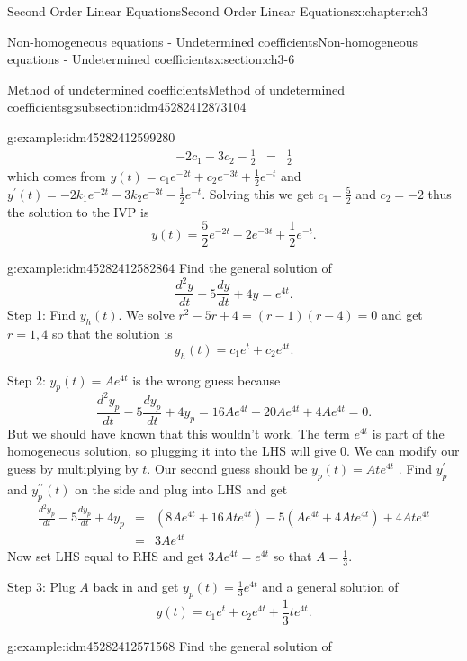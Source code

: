 \documentclass[oneside,10pt,]{book}
\numberwithin{equation}{section}
\numberwithin{equation}{section}
\newcommand{\amp}{&}
\begin{document}
\begin{chapterptx}{Second Order Linear Equations}{}{Second Order Linear Equations}{}{}{x:chapter:ch3}
\begin{sectionptx}{Non-homogeneous equations - Undetermined coefficients}{}{Non-homogeneous equations - Undetermined coefficients}{}{}{x:section:ch3-6}
\begin{subsectionptx}{Method of undetermined coefficients}{}{Method of undetermined coefficients}{}{}{g:subsection:idm45282412873104}
\begin{example}{}{g:example:idm45282412599280}
\begin{align*}
-2c_{1}-3c_{2}-\frac{1}{2} \amp = \amp \frac{1}{2}
\end{align*}
which comes from \(y(t)=c_{1}e^{-2t}+c_{2}e^{-3t}+\frac{1}{2}e^{-t}\) and \(y^{\prime}(t)=-2k_{1}e^{-2t}-3k_{2}e^{-3t}-\frac{1}{2}e^{-t}.\) Solving this we get \(c_{1}=\frac{5}{2}\) and \(c_{2}=-2\) thus the solution to the IVP is%
\begin{equation*}
y(t)=\frac{5}{2}e^{-2t}-2e^{-3t}+\frac{1}{2}e^{-t}.
\end{equation*}
%
\end{example}
\begin{example}{}{g:example:idm45282412582864}%
Find the general solution of%
\begin{equation*}
\frac{d^{2}y}{dt}-5\frac{dy}{dt}+4y=e^{4t}.
\end{equation*}
Step 1: Find \(y_{h}(t)\). We solve \(r^{2}-5r+4=(r-1)(r-4)=0\) and get \(r=1,4\) so that the solution is%
\begin{equation*}
y_{h}(t)=c_{1}e^{t}+c_{2}e^{4t}.
\end{equation*}
%
\par
Step 2: \(y_{p}(t)=Ae^{4t}\) is the wrong guess because%
\begin{equation*}
\frac{d^{2}y_{p}}{dt}-5\frac{dy_{p}}{dt}+4y_{p}=16Ae^{4t}-20Ae^{4t}+4Ae^{4t}=0.
\end{equation*}
But we should have known that this wouldn't work. The term \(e^{4t}\) is part of the homogeneous solution, so plugging it into the LHS will give 0. We can modify our guess by multiplying by \(t\). Our second guess should be \(y_{p}(t)=Ate^{4t}\) . Find \(y_{p}^{\prime}\) and \(y_{p}^{\prime\prime}(t)\) on the side and plug into LHS and get%
\begin{align*}
\frac{d^{2}y_{p}}{dt}-5\frac{dy_{p}}{dt}+4y_{p} \amp = \amp \left(8Ae^{4t}+16Ate^{4t}\right)-5\left(Ae^{4t}+4Ate^{4t}\right)+4Ate^{4t}\\
\amp = \amp 3Ae^{4t}
\end{align*}
Now set LHS equal to RHS and get \(3Ae^{4t}=e^{4t}\) so that \(A=\frac{1}{3}\).%
\par
Step 3: Plug \(A\) back in and get \(y_{p}(t)=\frac{1}{3}e^{4t}\) and a general solution of%
\begin{equation*}
y(t)=c_{1}e^{t}+c_{2}e^{4t}+\frac{1}{3}te^{4t}.
\end{equation*}
%
\end{example}
\begin{example}{}{g:example:idm45282412571568}%
Find the general solution of%
\begin{equation*}

\end{equation*}
\end{example}
\end{subsectionptx}
\end{sectionptx}
\end{chapterptx}
\end{document}
